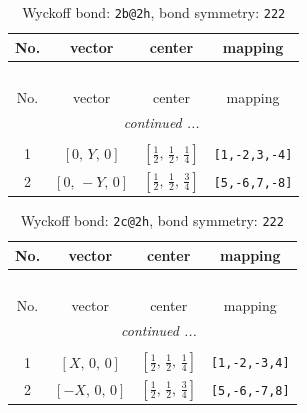 \documentclass[fleqn,8pt]{jsarticle}
\begin{document}
\renewcommand{\arraystretch}{1.2}
\begin{longtable}{cccc}
\caption{Wyckoff bond: {\tt 2b@2h}, bond symmetry: {\tt 222}}
 \\
 \hline \hline
No. & vector & center & mapping \\ \hline \endfirsthead

\multicolumn{3}{l}{\tablename\ \thetable{}} \\
 \hline \hline
No. & vector & center & mapping \\ \hline \endhead

 \hline \hline
\multicolumn{3}{r}{\footnotesize\it continued ...} \\ \endfoot

 \hline \hline
\multicolumn{3}{r}{} \\ \endlastfoot

1 & $\left[ 0,\, Y,\, 0 \right]$ & $\left[ \frac{1}{2},\, \frac{1}{2},\, \frac{1}{4} \right]$ & {\tt [1,-2,3,-4]} \\ \hline
2 & $\left[ 0,\, - Y,\, 0 \right]$ & $\left[ \frac{1}{2},\, \frac{1}{2},\, \frac{3}{4} \right]$ & {\tt [5,-6,7,-8]} \\
\end{longtable}
\renewcommand{\arraystretch}{1.2}
\begin{longtable}{cccc}
\caption{Wyckoff bond: {\tt 2c@2h}, bond symmetry: {\tt 222}}
 \\
 \hline \hline
No. & vector & center & mapping \\ \hline \endfirsthead

\multicolumn{3}{l}{\tablename\ \thetable{}} \\
 \hline \hline
No. & vector & center & mapping \\ \hline \endhead

 \hline \hline
\multicolumn{3}{r}{\footnotesize\it continued ...} \\ \endfoot

 \hline \hline
\multicolumn{3}{r}{} \\ \endlastfoot

1 & $\left[ X,\, 0,\, 0 \right]$ & $\left[ \frac{1}{2},\, \frac{1}{2},\, \frac{1}{4} \right]$ & {\tt [1,-2,-3,4]} \\ \hline
2 & $\left[ - X,\, 0,\, 0 \right]$ & $\left[ \frac{1}{2},\, \frac{1}{2},\, \frac{3}{4} \right]$ & {\tt [5,-6,-7,8]} \\
\end{longtable}
\renewcommand{\arraystretch}{1.2}
\end{document}
